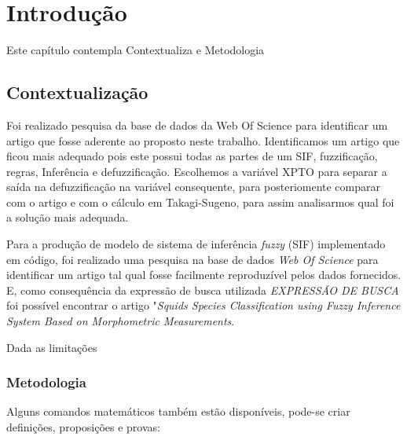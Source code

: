 \documentclass[courier]{uninove-ppgi}
\begin{document}
    
    \chapter{Introdução}
    
        \begin{resumocapitulo}
            Este capítulo contempla Contextualiza e Metodologia
        \end{resumocapitulo}
    
    \section{Contextualização}
    
        Foi realizado pesquisa da base de dados da Web Of Science para identificar um artigo que fosse aderente ao proposto neste trabalho.
        Identificamos um artigo que ficou mais adequado pois este possui todas as partes de um SIF, fuzzificação, regras, Inferência e defuzzificação.
        Escolhemos a variável XPTO para separar a saída na defuzzificação na variável consequente, para posteriomente comparar com o artigo e com o cálculo
        em Takagi-Sugeno, para assim analisarmos qual foi a solução mais adequada.
        
        Para a produção de modelo de sistema de inferência \textit{fuzzy} (SIF) implementado em código, foi realizado uma pesquisa na base de dados \textit{Web Of Science} para identificar um artigo tal qual fosse facilmente reproduzível pelos dados fornecidos. E, como consequência da expressão de busca utilizada \textit{EXPRESSÃO DE BUSCA} foi possível encontrar o artigo "\textit{Squids Species Classification using Fuzzy Inference System Based on Morphometric Measurements}.
        
        Dada as limitações
    
    \subsection{Metodologia}
    
    Alguns comandos matemáticos também estão disponíveis, pode-se criar definições, proposições e provas:
    
    
    
\end{document}
